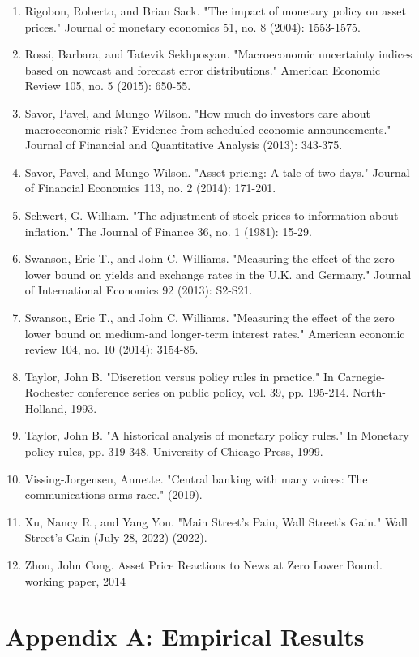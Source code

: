 \documentclass[12pt]{article}
\begin{document}
\begin{enumerate}
    \item{Rigobon, Roberto, and Brian Sack. "The impact of monetary policy on asset prices." Journal of monetary economics 51, no. 8 (2004): 1553-1575.}
    \item{Rossi, Barbara, and Tatevik Sekhposyan. "Macroeconomic uncertainty indices based on nowcast and forecast error distributions." American Economic Review 105, no. 5 (2015): 650-55.}
    \item{Savor, Pavel, and Mungo Wilson. "How much do investors care about macroeconomic risk? Evidence from scheduled economic announcements." Journal of Financial and Quantitative Analysis (2013): 343-375.}
    \item{Savor, Pavel, and Mungo Wilson. "Asset pricing: A tale of two days." Journal of Financial Economics 113, no. 2 (2014): 171-201.}
    \item{Schwert, G. William. "The adjustment of stock prices to information about inflation." The Journal of Finance 36, no. 1 (1981): 15-29.}
    \item{Swanson, Eric T., and John C. Williams. "Measuring the effect of the zero lower bound on yields and exchange rates in the U.K. and Germany." Journal of International Economics 92 (2013):  S2-S21.}
    \item{Swanson, Eric T., and John C. Williams. "Measuring the effect of the zero lower bound on medium-and longer-term interest rates." American economic review 104, no. 10 (2014): 3154-85.}
    \item{Taylor, John B. "Discretion versus policy rules in practice." In Carnegie-Rochester conference series on public policy, vol. 39, pp. 195-214. North-Holland, 1993.}
    \item{Taylor, John B. "A historical analysis of monetary policy rules." In Monetary policy rules, pp. 319-348. University of Chicago Press, 1999.}
    \item{Vissing-Jorgensen, Annette. "Central banking with many voices: The communications arms race." (2019).}
    \item{Xu, Nancy R., and Yang You. "Main Street's Pain, Wall Street's Gain." Wall Street's Gain (July 28, 2022) (2022).}
    \item{Zhou, John Cong. Asset Price Reactions to News at Zero Lower Bound. working paper, 2014}
\end{enumerate}
    
\pagebreak

\section{Appendix A: Empirical Results} \label{sec:Model}
\end{document}
